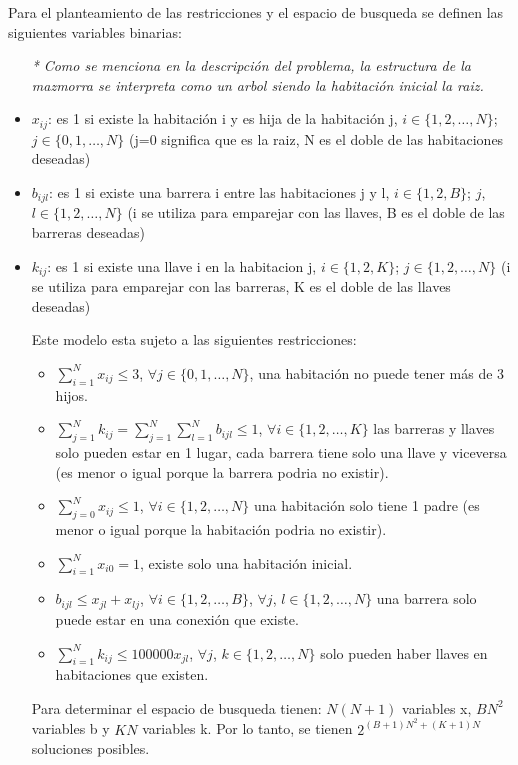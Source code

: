 \documentclass[letter, 10pt]{article}
\begin{document}
Para el planteamiento de las restricciones y el espacio de busqueda se definen las siguientes variables binarias: 
\begin{itemize}
    \item[\textit{*}]\textit{Como se menciona en la descripci\'on del problema, la estructura de la mazmorra se interpreta como un arbol siendo la habitaci\'on inicial la raiz.}
    
    \item $x_{ij}$: es 1 si existe la habitaci\'on i y es hija de la habitaci\'on j, $i \in \{1, 2, \dots, N\}$; $j \in \{0, 1, \dots, N\}$ (j=0 significa que es la raiz, N es el doble de las habitaciones deseadas)

    \item $b_{ijl}$: es 1 si existe una barrera i entre las habitaciones j y l, $i \in \{1, 2, B\}$; $j$, $l \in \{1, 2, \dots, N\}$ (i se utiliza para emparejar con las llaves, B es el doble de las barreras deseadas)

    \item $k_{ij}$: es 1 si existe una llave i en la habitacion j, $i \in \{1, 2, K\}$; $j \in \{1, 2, \dots, N\}$ (i se utiliza para emparejar con las barreras, K es el doble de las llaves deseadas)

    Este modelo esta sujeto a las siguientes restricciones:
\begin{itemize}
    \item $\sum_{i=1}^{N} x_{ij} \leq 3$, $\forall j \in \{0, 1, \dots, N\}$, una habitaci\'on no puede tener m\'as de 3 hijos.
    \item $\sum_{j=1}^{N} k_{ij} = \sum_{j=1}^{N} \sum_{l=1}^{N} b_{ijl} \leq 1$, $\forall i \in \{1, 2, \dots, K\}$ las barreras y llaves solo pueden estar en 1 lugar, cada barrera tiene solo una llave y viceversa (es menor o igual porque la barrera podria no existir).
    \item $\sum_{j=0}^{N} x_{ij} \leq 1$, $\forall i \in \{1, 2, \dots, N\}$ una habitaci\'on solo tiene 1 padre (es menor o igual porque la habitaci\'on podria no existir).
    \item $\sum_{i=1}^{N} x_{i0} = 1$, existe solo una habitaci\'on inicial.
    \item $b_{ijl} \leq x_{jl} + x_{lj}$, $\forall i \in \{1, 2, \dots, B\}$, $\forall j$, $l \in \{1, 2, \dots, N\}$ una barrera solo puede estar en una conexi\'on que existe.
    \item $\sum_{i=1}^{N} k_{ij} \leq 100000x_{jl}$, $\forall j$, $k \in \{1, 2, \dots, N\}$ solo pueden haber llaves en habitaciones que existen.
\end{itemize}

Para determinar el espacio de busqueda tienen: $N(N+1)$ variables x, $BN^2$ variables b y $KN$ variables k. Por lo tanto, se tienen $2^{(B+1)N^2 + (K+1)N}$ soluciones posibles.

    
\end{itemize}
\end{document}
